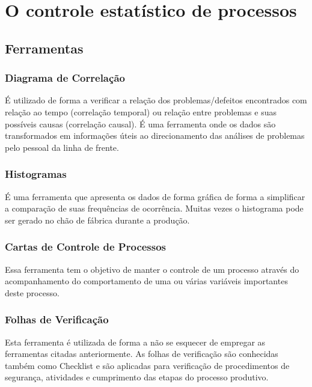 \chapter{O controle estatístico de processos}
\label{chap:controle_estatistico_de_processos}



\section{Ferramentas}
\label{sec:controle_estatistico_sec1}

\subsection{Diagrama de Correlação}
É utilizado de forma a verificar a relação dos problemas/defeitos encontrados com relação ao tempo (correlação temporal) ou relação entre problemas e suas possíveis causas (correlação causal). É uma ferramenta onde os dados são transformados em informações úteis ao direcionamento das análises de problemas pelo pessoal da linha de frente.

\subsection{Histogramas}
É uma ferramenta que apresenta os dados de forma gráfica de forma a simplificar a comparação de suas frequências de ocorrência. Muitas vezes o histograma pode ser gerado no chão de fábrica durante a produção.

\subsection{Cartas de Controle de Processos}
Essa ferramenta tem o objetivo de manter o controle de um processo através do acompanhamento do comportamento de uma ou várias variáveis importantes deste processo.

\subsection{Folhas de Verificação}
Esta ferramenta é utilizada de forma a não se esquecer de empregar as ferramentas citadas anteriormente. As folhas de verificação são conhecidas também como Checklist e são aplicadas para verificação de procedimentos de segurança, atividades e cumprimento das etapas do processo produtivo.

